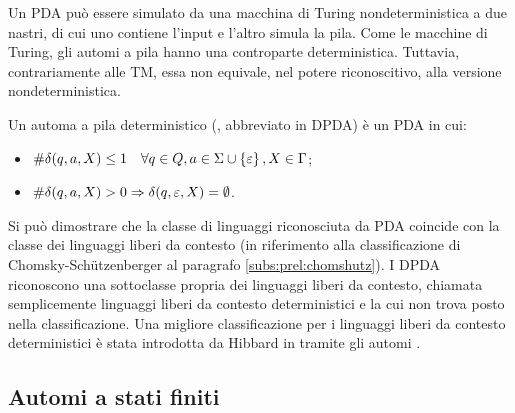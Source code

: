Un PDA può essere simulato da una macchina di Turing nondeterministica a due nastri, di cui uno contiene l'input e l'altro simula la pila.
Come le macchine di Turing, gli automi a pila hanno una controparte deterministica. Tuttavia, contrariamente alle TM, essa non equivale, nel potere riconoscitivo, alla versione nondeterministica.
\begin{defin}
	Un automa a pila deterministico (, abbreviato in DPDA) è un PDA in cui:
	\begin{itemize}
		\item $\# \delta(q,a,X)\leq 1\quad \forall q\in Q, a\in\Sigma\cup\left\{ \varepsilon \right\}, X\in\Gamma$;
		\item $\# \delta(q,a,X)>0\Rightarrow \delta(q,\varepsilon,X)=\emptyset$.
	\end{itemize}
\end{defin}

Si può dimostrare che la classe di linguaggi riconosciuta da PDA coincide con la classe dei linguaggi liberi da contesto (in riferimento alla classificazione di Chomsky-Schützenberger al paragrafo \ref{subs:prel:chomshutz}). I DPDA riconoscono una sottoclasse propria dei linguaggi liberi da contesto, chiamata semplicemente linguaggi liberi da contesto deterministici e la cui non trova posto nella classificazione. Una migliore classificazione per i linguaggi liberi da contesto deterministici è stata introdotta da Hibbard in \cite{Hibbard:67:CFdet} tramite gli automi .


\subsection{Automi a stati finiti}

